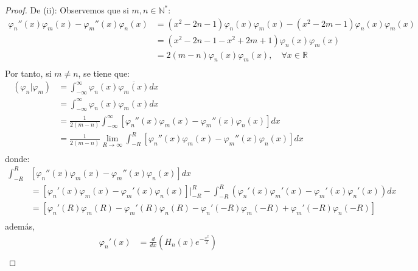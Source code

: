 \documentclass[12pt]{report}
\theoremstyle{largebreak}
\newcommand\pint[2]{\ensuremath{\left(#1\big|#2\right)}}
\newcommand\conj[1]{\ensuremath{\overline{#1}}}
\begin{document}
\begin{proof}
        De (ii): Observemos que si $m,n\in\mathbb{N}^*$:
        \begin{equation*}
            \begin{split}
                \varphi_n''(x)\varphi_m(x)-\varphi_m''(x)\varphi_n(x)&=(x^2-2n-1)\varphi_n(x)\varphi_m(x)-(x^2-2m-1)\varphi_n(x)\varphi_m(x) \\
                &=(x^2-2n-1-x^2+2m+1)\varphi_n(x)\varphi_m(x) \\ 
                &=2(m-n)\varphi_n(x)\varphi_m(x),\quad\forall x\in\mathbb{R} \\ 
            \end{split}
        \end{equation*}
        Por tanto, si $m\neq n$, se tiene que:
        \begin{equation*}
            \begin{split}
                \pint{\varphi_n}{\varphi_m}&=\int_{-\infty}^\infty \varphi_n(x)\conj{\varphi_m(x)}dx\\
                &=\int_{-\infty}^\infty\varphi_n(x)\varphi_m(x)dx\\
                &=\frac{1}{2(m-n)} \int_{-\infty}^\infty\left[\varphi_n''(x)\varphi_m(x)-\varphi_m''(x)\varphi_n(x)\right]dx\\
                &=\frac{1}{2(m-n)} \lim_{R\rightarrow\infty} \int_{-R}^R\left[\varphi_n''(x)\varphi_m(x)-\varphi_m''(x)\varphi_n(x)\right]dx\\
            \end{split}
        \end{equation*}
        donde:
        \begin{equation*}
            \begin{split}
                \int_{-R}^R&\left[\varphi_n''(x)\varphi_m(x)-\varphi_m''(x) \varphi_n(x)\right]dx\\
                &=\left[\varphi_n'(x)\varphi_m(x)-\varphi_m'(x)\varphi_n(x)\right]\Big|_{-R}^{R}-\int_{-R}^R(\varphi_n'(x)\varphi_m'(x)-\varphi_m'(x)\varphi_n'(x))dx\\
                &=\left[\varphi_n'(R)\varphi_m(R)-\varphi_m'(R)\varphi_n(R)-\varphi_n'(-R)\varphi_m(-R)+\varphi_m'(-R)\varphi_n(-R)\right] \\
            \end{split}
        \end{equation*}
        además,
        \begin{equation*}
            \begin{split}
                \varphi_n'(x)&=\frac{d}{dx}\left(H_n(x)e^{-\frac{x^2}{2}} \right)\\

\end{split}
\end{equation*}
\end{proof}
\end{document}
